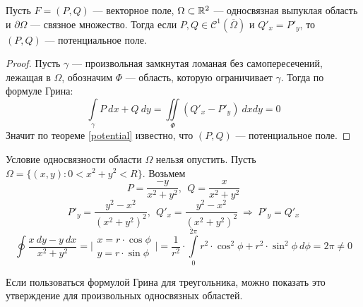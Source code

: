 \begin{theorem}
    Пусть $F=(P,Q)$ --- векторное поле, $\Omega\subset \mathbb{R}^2$ --- односвязная выпуклая область и
    $\partial \Omega$ --- связное множество. Тогда если $P,Q\in \mathcal{C}^1(\overline{\Omega})$ и $Q'_x=P'_y$, то\\
    $(P,Q)$ --- потенциальное поле.
\end{theorem}
\begin{proof}
    Пусть $\gamma$ --- произвольная замкнутая ломаная без самопересечений, лежащая в $\Omega$, обозначим $\Phi$ --- область, которую ограничивает $\gamma$. Тогда по формуле Грина:
    \[\int\limits_{\gamma}P\ dx+Q\ dy=\iint\limits_{\Phi}(Q'_x-P'_y)\ dxdy=0\]
    Значит по теореме \ref{potential} известно, что $(P,Q)$ --- потенциальное поле.
\end{proof}
\begin{example} 
    Условие односвязности области $\Omega$ нельзя опустить. Пусть\\
    $\Omega=\{(x,y): 0<x^2+y^2<R\}$. Возьмем 
    \[P=\frac{-y}{x^2+y^2},\ \ Q=\frac{x}{x^2+y^2}\]
    \[P'_y=\frac{y^2-x^2}{(x^2+y^2)^2},\ \ Q'_x=\frac{y^2-x^2}{(x^2+y^2)^2}\ \Rightarrow\ P'_y=Q'_x\]
    \[\oint\limits \frac{x\ dy-y\ dx}{x^2+y^2}=\Bigg|
        \begin{matrix}
            x=r\cdot \cos{\phi}\\
            y=r\cdot \sin{\phi}
        \end{matrix}\Bigg|=\frac{1}{r^2}\cdot \int\limits_{0}^{2\pi}r^2\cdot \cos^2{\phi}+r^2\cdot \sin^2{\phi}\ d\phi=2\pi\neq 0\]
\end{example}
\begin{comm}
    Если пользоваться формулой Грина для треугольника, можно показать это утверждение для произвольных односвязных областей.
\end{comm}
\newpage